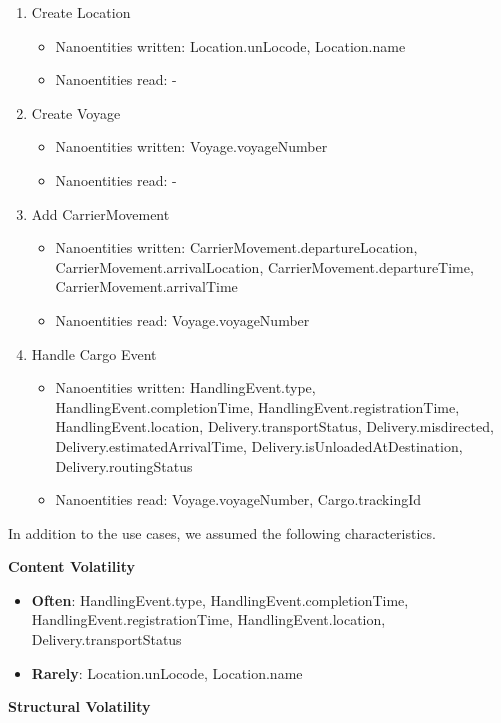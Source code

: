 \begin{enumerate}
	\item Create Location
	\begin{itemize}
		\item Nanoentities written: Location.unLocode, Location.name
		\item Nanoentities read: -
	\end{itemize}

	\item Create Voyage
	\begin{itemize}
		\item Nanoentities written: Voyage.voyageNumber
		\item Nanoentities read: -
	\end{itemize}
	
	\item Add CarrierMovement
	\begin{itemize}
		\item Nanoentities written: CarrierMovement.departureLocation, CarrierMovement.arrivalLocation, CarrierMovement.departureTime, CarrierMovement.arrivalTime
		\item Nanoentities read: Voyage.voyageNumber
	\end{itemize}
	
	\item Handle Cargo Event
	\begin{itemize}
		\item Nanoentities written: HandlingEvent.type, HandlingEvent.completionTime, HandlingEvent.registrationTime, HandlingEvent.location, Delivery.transportStatus, Delivery.misdirected, Delivery.estimatedArrivalTime, Delivery.isUnloadedAtDestination, Delivery.routingStatus
		\item Nanoentities read: Voyage.voyageNumber, Cargo.trackingId
	\end{itemize}
\end{enumerate}

In addition to the use cases, we assumed the following characteristics.

\textbf{Content Volatility}

\begin{itemize}
	\item \textbf{Often}: HandlingEvent.type, HandlingEvent.completionTime, HandlingEvent.registrationTime, HandlingEvent.location, Delivery.transportStatus 
	\item \textbf{Rarely}: Location.unLocode, Location.name
\end{itemize} 

\textbf{Structural Volatility}


